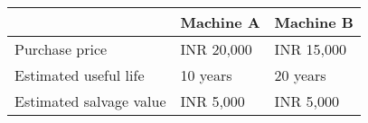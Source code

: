 \begin{center}
\begin{tabular}{|p{3cm}|p{3cm}|p{3cm}|}
\hline
& \textbf{Machine A} & \textbf{Machine B} \\
\hline
Purchase price & INR 20,000 & INR 15,000 \\
\hline
Estimated useful life & 10 years & 20 years\\
\hline
Estimated salvage value & INR 5,000 & INR 5,000 \\
\hline
\end{tabular}
\end{center}